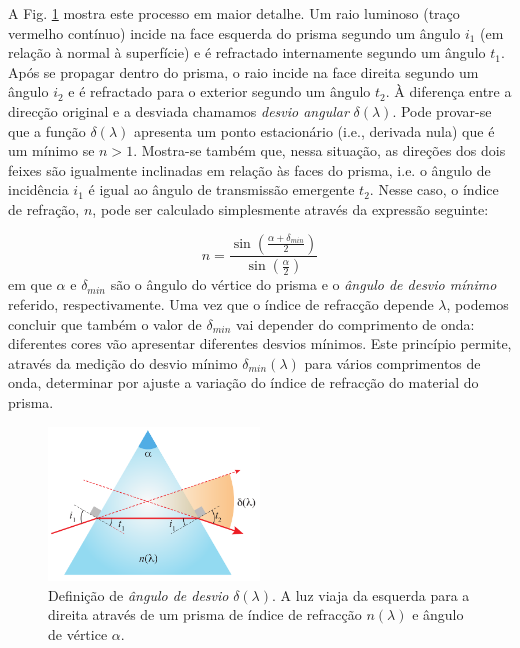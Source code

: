 \documentclass[12pt,a4paper,oneside]{paper}
\begin{document}
A Fig. \ref{fig:prisma2} mostra este processo em maior detalhe. Um raio luminoso (traço vermelho contínuo) incide na face
esquerda do prisma segundo um ângulo $i_1$ (em relação à normal à superfície) e é refractado internamente segundo um ângulo $t_1$. Após se propagar dentro do prisma, o raio incide na face direita segundo um ângulo $i_2$ e é refractado para o exterior segundo um ângulo $t_2$. À diferença entre a direcção original e a desviada chamamos \emph{desvio angular} $\delta(\lambda)$. Pode provar-se que a função $\delta(\lambda)$ apresenta um ponto estacionário (i.e., derivada nula) que é um mínimo se $n > 1$. Mostra-se também que, nessa situação, as direções dos dois feixes são igualmente inclinadas em relação às faces do prisma, i.e.  o ângulo de incidência $i_1$ é igual ao ângulo de transmissão emergente $t_2$. Nesse caso, o índice de refração, $n$, pode ser calculado simplesmente através da expressão seguinte: 

\begin{equation}
	\label{eq:desviomim}
	n= \frac{\sin \left( \frac{\alpha+ \delta_{min}}{2} \right) } {\sin \left(  \frac{\alpha}{2} \right)}  
\end{equation}
em que $\alpha$ e  $\delta_{min}$ são o ângulo do vértice do prisma e o \emph{ângulo de desvio mínimo} referido,
respectivamente. Uma vez que o índice de refracção depende $\lambda$, podemos concluir que também o valor de $\delta_{min}$
vai depender do comprimento de onda: diferentes cores vão apresentar diferentes desvios mínimos. Este princípio permite,
através da medição do desvio mínimo $\delta_{min}(\lambda)$ para vários comprimentos de onda, determinar por ajuste a variação
do índice de refracção do material do prisma.


\begin{figure}[htb]  \centering 
	\includegraphics[width=0.5\textwidth]{./planck_images/prisma2.pdf}
	\caption{Definição de \emph{ângulo de desvio} $\delta(\lambda)$. A luz viaja da esquerda para a direita através de um
	prisma de índice de refracção $n(\lambda)$ e ângulo de vértice $\alpha$. \label{fig:prisma2}} 
\end{figure}
\end{document}
